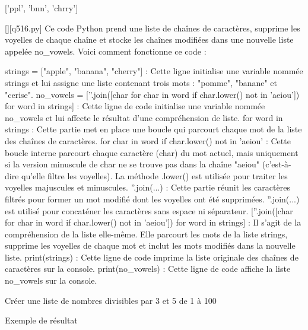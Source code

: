 ['ppl', 'bnn', 'chrry']
        \par
        \begin{solution}
            \renewcommand{\nomfichier}{q516.py}
            \pythonfile{\chemincode \nomfichier}[][\nomfichier]
            Ce code Python prend une liste de chaînes de caractères, supprime les voyelles de chaque chaîne et stocke les chaînes modifiées dans une nouvelle liste appelée no_vowels. Voici comment fonctionne ce code :

    strings = ["apple", "banana", "cherry"] : Cette ligne initialise une variable nommée strings et lui assigne une liste contenant trois mots : "pomme", "banane" et "cerise".
    no_vowels = [''.join([char for char in word if char.lower() not in 'aeiou']) for word in strings] : Cette ligne de code initialise une variable nommée no_vowels et lui affecte le résultat d'une compréhension de liste.
        for word in strings : Cette partie met en place une boucle qui parcourt chaque mot de la liste des chaînes de caractères.
        for char in word if char.lower() not in 'aeiou' : Cette boucle interne parcourt chaque caractère (char) du mot actuel, mais uniquement si la version minuscule de char ne se trouve pas dans la chaîne "aeiou" (c'est-à-dire qu'elle filtre les voyelles). La méthode .lower() est utilisée pour traiter les voyelles majuscules et minuscules.
        ''.join(...) : Cette partie réunit les caractères filtrés pour former un mot modifié dont les voyelles ont été supprimées. ''.join(...) est utilisé pour concaténer les caractères sans espace ni séparateur.
        [''.join([char for char in word if char.lower() not in 'aeiou']) for word in strings] : Il s'agit de la compréhension de la liste elle-même. Elle parcourt les mots de la liste strings, supprime les voyelles de chaque mot et inclut les mots modifiés dans la nouvelle liste.
    print(strings) : Cette ligne de code imprime la liste originale des chaînes de caractères sur la console.
    print(no_vowels) : Cette ligne de code affiche la liste no_vowels sur la console.
        \end{solution}
        

        \question
        Créer une liste de nombres divisibles par 3 et 5 de 1 à 100

Exemple de résultat

